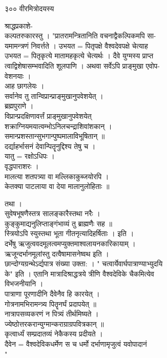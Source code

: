 \documentclass[11pt, openany]{book}
\begin{document}
{{{{{{{{{{{३०० }{वीरमित्रोदयस्य}{ श्राद्धप्रकाशे-\\
कल्पतरुकारस्तु । "प्रातरामन्त्रितानिति वचनाद्वैकल्पिकमपि सा-\\
यमामन्त्रणं निवर्त्तते । उभयत = पितृपक्षे वैश्वदेवपक्षे चेत्याह
\textbar{}\\
उभयत = पितृकृत्ये मातामहकृत्ये चेत्यर्थः । दैवे युग्मस्य प्राप्त\\
त्वाद्विशेषासम्भवादिति शूलपाणि । अथवा सर्वेऽपि प्राङ्मुखा एवोप-\\
वेशनयाः ।\\
आह छागलेयः ।\\
सर्वानेव तु तान्विप्रान्प्राङ्मुखानुपवेशयेत् ।\\
ब्रह्मपुराणे ।\\
विप्रान्प्रदक्षिणावर्त्तं प्राङ्मुखानुपवेशयेत् \textbar{}\textbar{}\\
शक्राग्नियमयात्वम्भोऽनिलचन्द्राशिवांशकान् ।\\
समान्प्रशस्तान्सुभगान्पुष्पमालाविभूषितान् ॥\\
दर्द्याहर्भासनं देवान्पितॄनुद्दिश्य तेषु च ।\\
यातु = रक्षोऽधिपः ।\\
वृद्धपाराशरः ।\\
मालत्या शतपत्र्या वा मल्लिकाकुब्जयोरपि ।\\
केतक्या पाटलाया वा देया मालानुलोहिताः ॥

{ तथा ।\\
सुवेषभूषणैस्तत्र सालङ्कारैस्तथा नरैः ।\\
कुङ्कुमाद्यनुलिप्ताङ्गंभाव्यं तु ब्राह्मणैः सह ॥\\
स्त्रियोऽपि स्युस्तथा भूता गीतनृत्यादिहर्षिताः । इति ।\\
दर्भेषु ऋजुत्ववदमूलत्वमप्युक्तमाश्वलायनकारिकायाम् ।\\
ऋजून्दर्भानमूलांस्तु दत्वैषामासनेष्वथ इति ।\\
छान्दोग्यग्रन्थेऽर्द्यपात्र संख्या उक्ता: । "
चत्वार्येवार्घपात्राण्याभ्युदयि\\
के" इति । एतानि मात्रादिश्राद्धत्रये त्रीणि वैश्वदेविके चैकमित्येव\\
विभजनीयानि ।\\
पात्राणा पूरणादीनि दैवेनैव हि कारयेत् ।\\
गोत्रनामभिरामन्त्र्य पितॄनर्घं प्रदापयेत् ॥\\
नात्रापसव्यकरणं न पित्र्यं तीर्थमिष्यते ।\\
ज्येष्ठोत्तरकरान्युग्मान्कराग्राग्रपवित्रकान् ॥\\
कृत्वार्ध्यं सम्प्रदातव्यं नेकैकस्य प्रदीयते ।\\
दैवेन = वैश्वदेविकधर्मेण स च धर्मो दर्भाणामृजुत्वं यवोपादानं\\
"

}}}}}}}}}}}}
\end{document}
